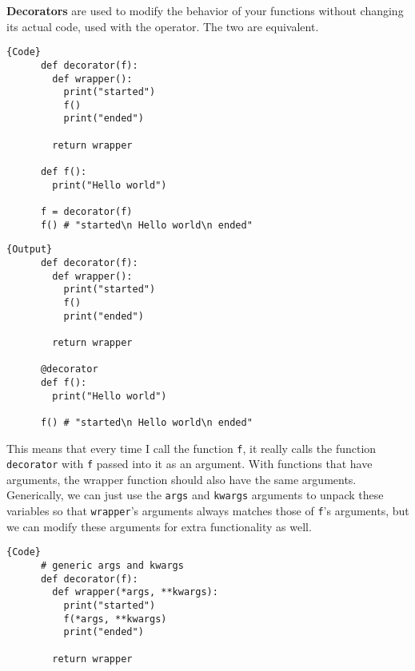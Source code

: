 \documentclass{article}
\begin{document}
  \begin{definition}[Decorators]
    \textbf{Decorators} are used to modify the behavior of your functions without changing its actual code, used with the \texttt{\@} operator. The two are equivalent. 

    \noindent\begin{minipage}{.5\textwidth}
    \begin{lstlisting}[]{Code}
      def decorator(f): 
        def wrapper(): 
          print("started") 
          f()
          print("ended") 

        return wrapper

      def f(): 
        print("Hello world") 

      f = decorator(f)
      f() # "started\n Hello world\n ended"
    \end{lstlisting}
    \end{minipage}
    \hfill
    \begin{minipage}{.49\textwidth}
    \begin{lstlisting}[]{Output}
      def decorator(f): 
        def wrapper(): 
          print("started") 
          f()
          print("ended") 

        return wrapper

      @decorator
      def f(): 
        print("Hello world") 

      f() # "started\n Hello world\n ended"
    \end{lstlisting}
    \end{minipage}

    This means that every time I call the function \texttt{f}, it really calls the function \texttt{decorator} with \texttt{f} passed into it as an argument. With functions that have arguments, the wrapper function should also have the same arguments. Generically, we can just use the \texttt{\*args} and \texttt{\*\*kwargs} arguments to unpack these variables so that \texttt{wrapper}'s arguments always matches those of \texttt{f}'s arguments, but we can modify these arguments for extra functionality as well. 

    \noindent\begin{minipage}{.5\textwidth}
    \begin{lstlisting}[]{Code}
      # generic args and kwargs
      def decorator(f): 
        def wrapper(*args, **kwargs): 
          print("started") 
          f(*args, **kwargs)
          print("ended") 

        return wrapper


\end{lstlisting}
\end{minipage}
\end{definition}
\end{document}
